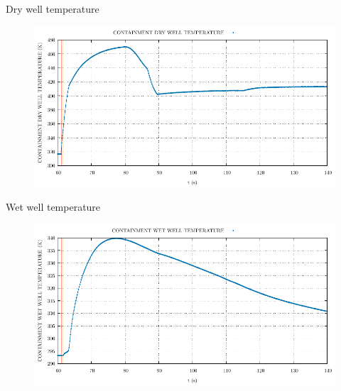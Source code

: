 \begin{frame}{Dry well temperature}
	\begin{figure}
		\centering
		\includegraphics[width=\textwidth]{./02SteamLineBreak/graphs/CONTAINMENT DRY WELL TEMPERATURE.pdf}
		
	\end{figure}
	
\end{frame}
\begin{frame}{Wet well temperature}
	\begin{figure}
		\centering
		\includegraphics[width=\textwidth]{./02SteamLineBreak/graphs/CONTAINMENT WET WELL TEMPERATURE.pdf}
		
	\end{figure}
	
\end{frame}



